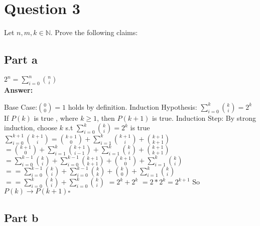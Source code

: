 \documentclass[12pt]{article}
\begin{document}
\newpage
\section*{Question 3}

Let $n,m,k\in\mathbb{N}$. Prove the following claims:
\subsection*{Part a}

$2^{n}=\sum_{i=0}^{n}\binom{n}{i}$\\

{\noindent\bf Answer:}
{
 \newline
Base Case:$\binom{0}{0}=1$ holds by definition.\newline
\newline
Induction Hypothesis: $\sum_{i=0}^{k}\binom{k}{i}=2^{k}$\newline
If $P(k)$ is true , where $k \geq 1$, then $P(k+1)$ is true.\newline
 \newline
Induction Step:
By strong induction, choose $k$ s.t $\sum_{i=0}^{k}\binom{k}{i}=2^{k}$ is true\newline
 $\sum_{i=0}^{k+1}\binom{k+1}{i}=\binom{k+1}{0}+\sum_{i=1}^{k}\binom{k+1}{i}+\binom{k+1}{k+1}$\newline
$= \binom{k+1}{0}+\sum_{i=1}^{k}\binom{k+1}{i-1} + \sum_{i=1}^{k}\binom{k}{i}+\binom{k+1}{k+1}$\newline
$=\sum_{i=0}^{k-1}\binom{k}{i}+\sum_{i=0}^{k-1}\binom{k+1}{k+1}+ \binom{k+1}{0}+\sum_{i=1}^{k}\binom{k}{i}$\newline
$==\sum_{i=0}^{k-1}\binom{k}{i}+\sum_{i=0}^{k-1}\binom{k}{k}+ \binom{k}{0}+\sum_{i=1}^{k}\binom{k}{i}$\newline
$==\sum_{i=0}^{k}\binom{k}{i}+\sum_{i=0}^{k}\binom{k}{i}$
$=2^{k}+2^{k}$
$=2*2^{k}=2^{k+1}$\newline
So $  P(k) \rightarrow P(k+1) \square$

}
\subsection*{Part b}
\end{document}
